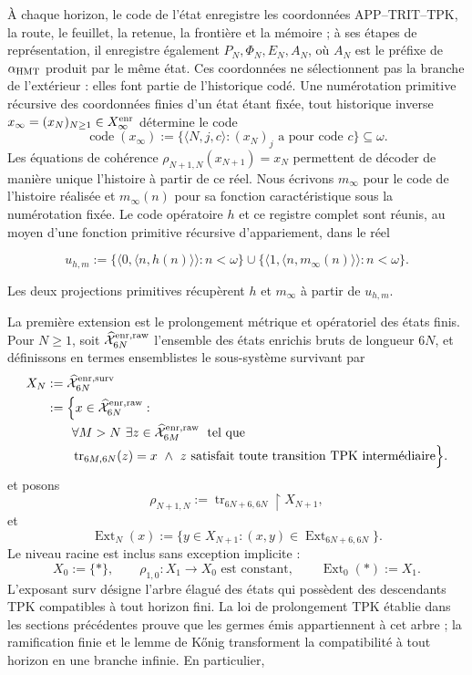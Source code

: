 À chaque horizon, le code de l'état enregistre les coordonnées APP--TRIT--TPK, la route, le feuillet, la retenue, la frontière et la mémoire ; à ses étapes de représentation, il enregistre également \(P_N,\Phi_N,E_N,A_N\), où \(A_N\) est le préfixe de \(\alpha_{\rm HMT}\) produit par le même état. Ces coordonnées ne sélectionnent pas la branche de l'extérieur : elles font partie de l'historique codé. Une numérotation primitive récursive des coordonnées finies d'un état étant fixée, tout historique inverse \(x_\infty=(x_N)_{N\geq1}\in X_\infty^{\rm enr}\) détermine le code
\[
 \operatorname{code}(x_\infty)
 :=\{\langle N,j,c\rangle:(x_N)_j\text{ a pour code }c\}\subseteq\omega.
\]
Les équations de cohérence
\(\rho_{N+1,N}(x_{N+1})=x_N\) permettent de décoder de manière unique
l’histoire à partir de ce réel. Nous écrivons \(m_\infty\) pour le code de
l’histoire réalisée et \(m_\infty(n)\) pour sa fonction caractéristique sous la
numérotation fixée. Le code opératoire \(h\) et ce registre complet sont
réunis, au moyen d’une fonction primitive récursive d’appariement, dans le réel

\[
 u_{h,m}:=
 \{\langle0,\langle n,h(n)\rangle\rangle:n<\omega\}
 \cup
 \{\langle1,\langle n,m_\infty(n)\rangle\rangle:n<\omega\}.
\tag{C.33a}\label{eq:ch-codigo-conjunto}
\]

Les deux projections primitives récupèrent \(h\) et \(m_\infty\) à partir de \(u_{h,m}\).

La première extension est le prolongement métrique et opératoriel des états finis. Pour \(N\ge1\), soit \(\widehat{\mathcal X}^{\rm enr,raw}_{6N}\) l'ensemble des états enrichis bruts de longueur \(6N\), et définissons en termes ensemblistes le sous-système survivant par
\[
\begin{aligned}
 X_N
 &:=\widehat{\mathcal X}^{\rm enr,surv}_{6N}\\
 &:=\Bigl\{x\in\widehat{\mathcal X}^{\rm enr,raw}_{6N}:\\[-.2ex]
 &\qquad\forall M>N\ \exists z\in
   \widehat{\mathcal X}^{\rm enr,raw}_{6M}\;\text{ tel que}\\[-.2ex]
 &\qquad\operatorname{tr}_{6M,6N}(z)=x\ \wedge\
   z\text{ satisfait toute transition TPK intermédiaire}\Bigr\}.
\end{aligned}
\]
et posons
\[
 \rho_{N+1,N}:=\operatorname{tr}_{6N+6,6N}\!\upharpoonright X_{N+1},
\]
et
\[
 \operatorname{Ext}_N(x):=
 \{y\in X_{N+1}:(x,y)\in
 \operatorname{Ext}_{6N+6,6N}\}.
\]
Le niveau racine est inclus sans exception implicite :
\[
 X_0:=\{\ast\},\qquad
 \rho_{1,0}:X_1\to X_0\text{ est constant},\qquad
 \operatorname{Ext}_0(\ast):=X_1.
\]
L’exposant \(\mathrm{surv}\) désigne
l’arbre élagué des états qui possèdent des descendants TPK compatibles à tout
horizon fini. La loi de prolongement TPK établie dans les sections
précédentes prouve que les germes
émis appartiennent à cet arbre ; la ramification finie et le lemme de Kőnig
transforment la compatibilité à tout horizon en une branche infinie. En
particulier,

